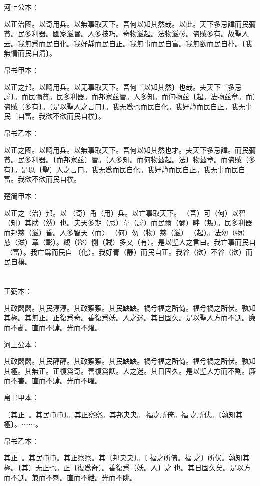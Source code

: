 \documentclass[a5paper]{ctexbook}
\begin{document}
    河上公本：

    以正治國。以奇用兵。以無事取天下。吾何以知其然哉。以此。天下多忌諱而民彌貧。民多利器。國家滋昬。人多技巧。奇物滋起。法物滋彰。盗賊多有。故聖人云。我無爲而民自化。我好靜而民自正。我無事而民自富。我無欲而民自朴。〔我無情而民自清〕。

    帛书甲本：

    以正之邦。以畸用兵。以无事取天下。吾何〔以知其然〕也哉。夫天下〔多忌諱〕。而民彌貧。民多利器。而邦家兹昬。人多知。而何物兹〔起。法物兹章。而〕盗賊〔多有〕。〔是以聖人之言曰〕。我无爲也而民自化。我好静而民自正。我无事民〔自富。我欲不欲而民自樸〕。

    帛书乙本：

    以正之國。以畸用兵。以無事取天下。吾何以知其然也才。夫天下多忌諱。而民彌貧。民多利器。〔而邦家兹〕昬。〔人多知。而何物兹起。法〕物兹章。而盗賊〔多有〕。是以〔聖〕人之言曰。我无爲而民自化。我好静而民自正。我无事而民自富。我欲不欲而民自樸。

    楚简甲本：

    以正之（治）邦。以󶵊（奇）甬（用）兵。以亡事取天下。󼾲（吾）可（何）以智（知）其肰（然）也。夫天多期（忌）韋（諱）而民爾（彌）畔（叛）。民多利器而邦慈（滋）昏。人多智天〈而〉𢦪（何）勿（物）慈（滋）󶵋（起）。法勿（物）慈（滋）章（彰）。覜（盜）惻（賊）多又（有）。是以聖人之言曰。我亡事而民自󶵌（富）。我亡爲而民自󶵍（化）。我好青（靜）而民自正。我谷（欲）不谷（欲）而民自樸。

    \chapter{}
    王弼本：

    其政悶悶。其民淳淳。其政察察。其民缺缺。禍兮福之所倚。福兮禍之所伏。孰知其極。其無正。正復爲奇。善復爲妖。人之迷。其日固久。是以聖人方而不割。廉而不劌。直而不肆。光而不燿。

    河上公本：

    其政悶悶。其民醇醇。其政察察。其民缺缺。禍兮福之所倚。福兮禍之所伏。孰知其極。其無正。正復爲奇。善復爲訞。人之迷。其日固久。是以聖人方而不割。廉而不害。直而不肆。光而不曜。

    帛书甲本：

    〔其正󱁅󱁅。其民屯屯〕。其正察察。其邦夬夬。𢢸福之所倚。福𢢸之所伏。〔孰知其極〕。⋯⋯。

    帛书乙本：

    其正󱁅󱁅。其民屯屯。其正察察。其〔邦夬夬〕。〔𢢸福之所倚。福𢢸之〕所伏。孰知其極。〔其〕无正也。正〔復爲奇〕。善復爲〔妖。人〕之𢘻也。其日固久矣。是以方而不割。兼而不刺。直而不紲。光而不眺。
\end{document}

